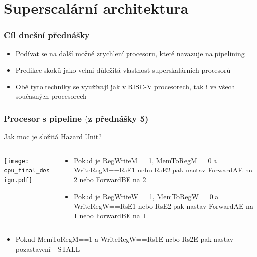 \documentclass{beamer}
\subtitle{Lekce 06. Superskalární architektura\\a\\prediktory skoků}
\author{Pavel Píša \phantom{xxxxxxxxx} Petr Štěpán \\ \small\texttt{pisa@fel.cvut.cz}\phantom{xxxx}\small\texttt{stepan@fel.cvut.cz}}
\begin{document}
\maketitle

\section{Superscalární architektura}

\begin{frame}
\frametitle{Cíl dnešní přednášky}

\begin{itemize}
 \item Podívat se na další možné zrychlení procesoru, které navazuje na pipelining
 \item Predikce skoků jako velmi důležitá vlastnost superskalárních procesorů
 \item Obě tyto techniky se využívají jak v RISC-V procesorech, tak i ve všech současných procesorech
\end{itemize}

\end{frame}

\begin{frame}

\frametitle{Procesor s pipeline (z přednášky 5)}

Jak moc je složitá Hazard Unit?
\begin{columns}
\begin{column}{0.67\textwidth}
\texttt{[image: cpu\_final\_design.pdf]}
\end{column}
\begin{column}{0.33\textwidth}
\footnotesize
\begin{itemize}
\item Pokud je RegWriteM==1, MemToRegM==0 a WriteRegM==RsE1 nebo RsE2 pak nastav ForwardAE na 2 nebo ForwardBE na 2
\item Pokud je RegWriteW==1, MemToRegW==0 a WriteRegW==RsE1 nebo RsE2 pak nastav ForwardAE na 1 nebo ForwardBE na 1
\end{itemize}
\end{column}
\end{columns}
\bigskip
\footnotesize
\begin{itemize}
\item Pokud MemToRegM==1 a WriteRegW==Rs1E nebo Rs2E pak nastav pozastavení - STALL
\end{itemize}
\end{frame}
\end{document}
